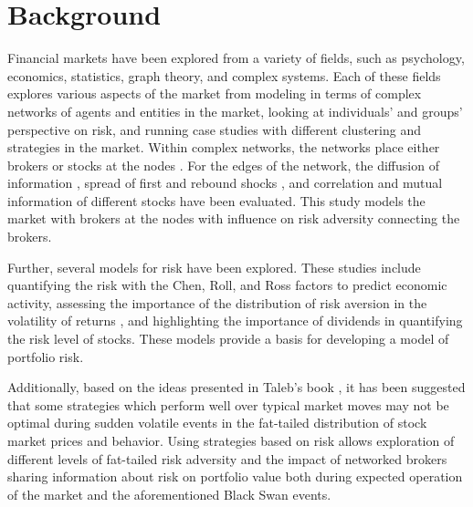 \documentclass[letterpaper, 11 pt, proceedings]{IEEEtran}
\begin{document}
	\section{Background}\label{sec:background}
	Financial markets have been explored from a variety of fields, such as psychology, economics, statistics, graph theory, and complex systems. Each of these fields explores various aspects of the market  from modeling in terms of complex networks of agents and entities in the market, looking at individuals' and groups' perspective on risk, and running case studies with different clustering and strategies in the market. Within complex networks, the networks place either brokers or stocks at the nodes \cite{baydelli_hierarchicalmarket,kulmann_marketscomplexsystems,dimaggio_relevancebrokernetworks,tse_networkstocks}. For the edges of the network, the diffusion of information \cite{dimaggio_relevancebrokernetworks}, spread of first and rebound shocks \cite{gai_contagion}, and correlation and mutual information of different stocks \cite{li_correlation, fiedor_networksmutualinformationrate} have been evaluated. This study models the market with brokers at the nodes with influence on risk adversity connecting the brokers. 
	
	Further, several models for risk have been explored. These studies include quantifying the risk with the Chen, Roll, and Ross factors \cite{cooper_realinvestmentandrisk} to predict economic activity, assessing the importance of the distribution of risk aversion in the volatility of returns \cite{lansing_riskaversion}, and highlighting the importance of dividends in quantifying the risk level of stocks. These models provide a basis for developing a model of portfolio risk.
	
	Additionally, based on the ideas presented in Taleb's book \cite{taleb_antifragile}, it has been suggested that some strategies which perform well over typical market moves may not be optimal during sudden volatile events in the fat-tailed distribution of stock market prices and behavior. Using strategies based on risk allows exploration of different levels of fat-tailed risk adversity and the impact of networked brokers sharing information about risk on portfolio value both during expected operation of the market and the aforementioned Black Swan events.
	
	
\end{document}
